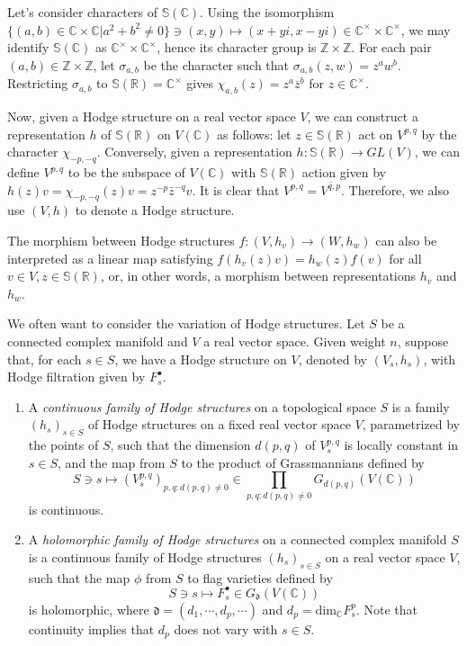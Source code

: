 Let's consider characters of $\mathbb S(\mathbb C)$. Using the isomorphism $ \{(a,b)\in \mathbb C \times \mathbb C|a^2+b^2 \ne0\} \ni (x,y) \mapsto (x+yi,x-yi) \in \mathbb C ^\times \times \mathbb C ^\times $, we may identify $\mathbb S(\mathbb C)$ as $\mathbb C ^\times \times \mathbb C ^\times $, hence its character group is $\mathbb Z \times \mathbb Z$. For each pair $(a,b)\in \mathbb Z \times \mathbb Z$, let $\sigma_{a,b}$ be the character such that $\sigma_{a,b}(z,w)=z^aw^b$. Restricting $\sigma_{a,b}$ to $\mathbb S(\mathbb R)=\mathbb C^\times$ gives $\chi_{a,b}(z)=z^a\bar z^b$ for $z\in \mathbb C^ \times$.

Now, given a Hodge structure on a real vector space $V$, we can construct a representation $h$ of $\mathbb S(\mathbb R)$ on $V(\mathbb C)$ as follows: let $z\in \mathbb S(\mathbb R)$ act on $V^{p,q}$ by the character $\chi_{-p,-q}$. Conversely, given a representation $h:\mathbb S(\mathbb R) \to GL(V)$, we can define $V^{p,q}$ to be the subspace of $V(\mathbb C)$ with $\mathbb S(\mathbb R)$ action given by $h(z)v=\chi_{-p,-q}(z)v=z^{-p}\bar z^{-q} v$. It is clear that $V^{p,q}=\overline{V^{q,p}}$. Therefore, we also use $(V,h)$ to denote a Hodge structure.

The morphism between Hodge structures $f:(V,h_v)\to (W,h_w)$ can also be interpreted as a linear map satisfying $f(h_v(z)v)=h_w(z)f(v)$ for all $v \in V, z\in \mathbb S(\mathbb R) $, or, in other words, a morphism between representations $h_v$ and $h_w$. 

We often want to consider the variation of Hodge structures. Let $S$ be a connected complex manifold and $V$ a real vector space. Given weight $n$, suppose that, for each $s\in S$, we have a Hodge structure on $V$, denoted by $(V_s,h_s)$, with Hodge filtration given by $F_s^\bullet$. 

\begin{definition}
 \label{definition-continuity-and-holomorphicity}
\begin{enumerate}
 \item  A {\it continuous family of Hodge structures} on a topological space $S$ is a family $(h_s)_{s \in S}$ of Hodge structures on a fixed real vector space $V$, parametrized by the points of $S$, such that the dimension $d(p,q)$ of $V_s^{p,q}$ is locally constant in $s\in S$, and the map from $S$ to the product of Grassmannians defined by
$$
S \ni s  \mapsto (V_s^{p,q})_{p,q:d(p,q)\ne 0} \in \prod_{p,q:d(p,q)\ne0}G_{d(p,q)}(V(\mathbb C))
$$
is continuous.

\item A {\it holomorphic family of Hodge structures} on a connected complex manifold $S$ is a continuous family of Hodge structures $(h_s)_{s \in S}$ on a real vector space $V$, such that the map $\phi$ from $S$ to flag varieties defined by
$$
S \ni s \mapsto F_s ^\bullet \in G_\mathfrak d (V(\mathbb C))
$$
is holomorphic, where $\mathfrak d= (d_1,\cdots,d_p,\cdots)$ and $d_p=\text{dim}_\mathbb C F^p_s $. Note that continuity implies that $d_p$ does not vary with $s\in S$.
\end{enumerate}

\end{definition}

